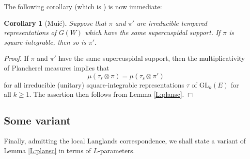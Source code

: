 \documentclass[11pt]{amsart}
\numberwithin{equation}{section}
\theoremstyle{plain}
\newtheorem{cor}[thm]{Corollary}
\theoremstyle{definition}
\theoremstyle{remark}
\def\GL{\mathrm{GL}}
\begin{document}
The following corollary (which is \cite[Theorem 5.1(i)]{muic}) is now immediate:

\begin{cor}[Mui\'c]  \label{C:muicsq}
Suppose that $\pi$ and $\pi'$ are irreducible tempered representations of $G(W)$ which have the same supercuspidal support.
If $\pi$ is square-integrable, then so is $\pi'$.
\end{cor}

\begin{proof}
If $\pi$ and $\pi'$ have the same supercuspidal support, then the multiplicativity of Plancherel measures implies that
\[ \mu(\tau_s \otimes \pi) = \mu(\tau_s \otimes \pi') \]
for all irreducible (unitary) square-integrable representations $\tau$ of $\GL_k(E)$ for all $k \ge 1$.
The assertion then follows from Lemma \ref{L:plansc}. 
\end{proof}

\subsection{Some variant}

Finally, admitting the local Langlands correspondence, we shall state a variant of Lemma \ref{L:plansc} in terms of $L$-parameters.
\end{document}
